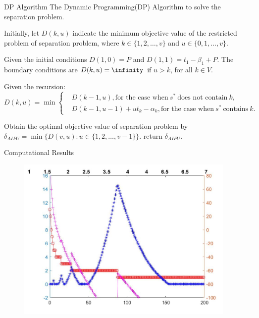 \documentclass[14pt]{beamer}
\begin{document}
\begin{frame}{DP Algorithm}
	The Dynamic Programming(DP) Algorithm to solve the separation problem.
	\begin{description}
	\justifying
	\footnotesize
	\item[Step 1.] Initially, let $D(k,u)$ indicate the minimum objective value of the restricted problem of separation problem, where $k\in \{1,2,\ldots,v\}$ and $u\in \{0,1,\ldots,v\}$.
	\item[Step 2.] Given the initial conditions $D(1,0) = P$ and $D(1,1) = t_1 - \beta_1 +P$. The boundary conditions are $D(k,u) = \infinity$ if $u > k$, for all $k \in V$.
	\item[Step 3.] Given the recursion:
	\begin{equation*}
	D(k,u)= \min \left\{
	\begin{aligned}
	& D(k-1,u), \text{for the case when} \ s^* \ \text{does not contain} \ k, \\
	& D(k-1,u-1) + u t_k - \alpha_k ,\text{for the case when} \ s^* \ \text{contains} \ k.
	\end{aligned}
	\right.
	\end{equation*}

\item[Step 4.] Obtain the optimal objective value of separation problem by
$\delta_{AIPU} = \min\{D(v,u): u\in \{1,2,\ldots,v-1\}\}$.
 return $\delta_{AIPU}$.
	\end{description}

\end{frame}

\begin{frame}{Computational Results}
	\vspace{-3mm}
	\begin{figure}[H]
	\centering
	\includegraphics[width=0.95\textwidth]{Figures/Image30}
	\end{figure}
	\centering
\end{frame}
\end{document}

